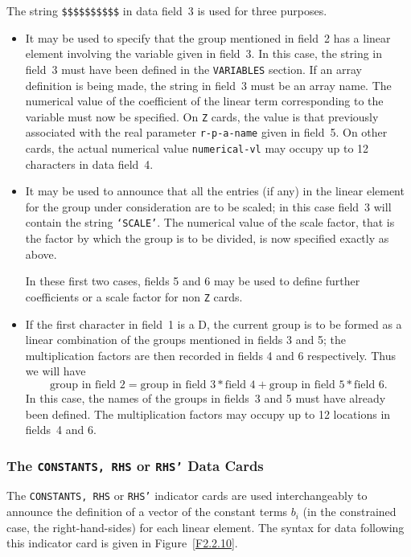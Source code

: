 \documentclass[a4paper]{article}
\begin{document}
The string {\tt \$\$\$\$\$\$\$\$\$\$}  in  data  field~3 is  used  for
three purposes.
\begin{itemize}
\item
It may be used to specify  that  the group  mentioned in field~2 has a
linear element
involving the variable given in field~3.  In this case,
the string in field~3 must  have been defined  in the {\tt  VARIABLES}
section.  If an array definition is being made, the string  in field~3
must be an array name.
The numerical  value of the coefficient of the
linear term corresponding  to the variable must  now be specified.  On
{\tt Z} cards,
the value  is that previously  associated with the real
parameter
{\tt r-p-a-name}  given in field~5.   On other cards, the
actual numerical  value {\tt  numerical-vl}  may occupy  up   to   12
characters in data field~4.

\item
It may be used to announce that all the entries (if any) in the linear
element
for  the  group under consideration are to  be scaled; in this
case field~3  will contain the   string  {\tt `SCALE'}.
The numerical value of the scale factor,  that is the  factor by which
the group is to be divided, is now specified exactly as above.

In these first two cases, fields 5 and 6 may be used to define further
coefficients or a scale factor for non {\tt Z} cards.

\item
If the first character in field~1 is a D,  the current  group is to be
formed as a linear combination of the groups mentioned in fields 3 and
5;  the multiplication  factors are  then recorded in  fields  4 and 6
respectively. Thus we will have
\[
\mbox{group in field~2} = \mbox{group in field~3} * \mbox{field~4} +
                          \mbox{group in field~5} * \mbox{field~6}.
\]
In this case,  the names of the groups  in  fields~3  and 5  must have
already been defined.  The multiplication factors may occupy up  to 12
locations in fields~4 and 6.
\end{itemize}

\subsubsection{\label{S2.2.10}The {\tt CONSTANTS, RHS} or {\tt RHS'}
Data Cards}

The  {\tt CONSTANTS, RHS}  or   {\tt RHS'}  indicator  cards
are  used
interchangeably to announce the definition of a vector of the constant
terms $b_i$ (in the constrained  case, the right-hand-sides) for  each
linear element.
The syntax for data following this indicator  card is
given in Figure~\ref{F2.2.10}.
\end{document}
